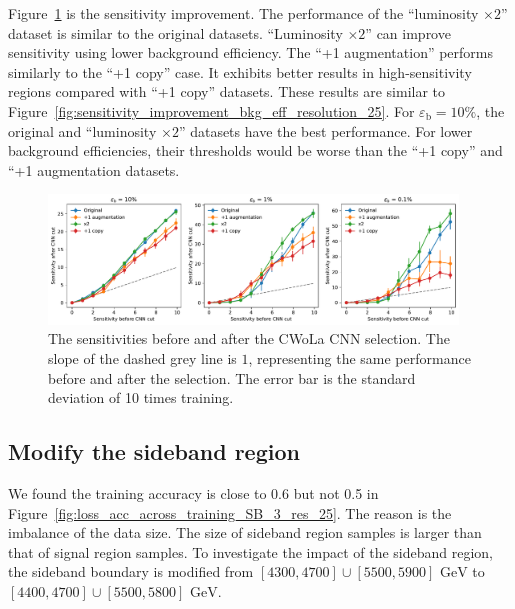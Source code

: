 \documentclass[12pt]{article}
\begin{document}
        Figure~\ref{fig:sensitivity_improvement_aug_1_x2_copy_1_res_25} is the sensitivity improvement. The performance of the ``luminosity $\times 2$'' dataset is similar to the original datasets. ``Luminosity $\times 2$'' can improve sensitivity using lower background efficiency. The ``+1 augmentation'' performs similarly to the ``+1 copy'' case. It exhibits better results in high-sensitivity regions compared with ``+1 copy'' datasets. These results are similar to Figure~\ref{fig:sensitivity_improvement_bkg_eff_resolution_25}. For $\varepsilon_{\text{b}} = 10 \%$, the original and ``luminosity $\times 2$'' datasets have the best performance. For lower background efficiencies, their thresholds would be worse than the ``+1 copy'' and ``+1 augmentation datasets.
        \begin{figure}[htpb]
            \centering
            \includegraphics[width=0.97\textwidth]{HVmodel_sensitivity_improvement_origin_aug_1_x2_copy_1_res_25.pdf}
            \caption{The sensitivities before and after the CWoLa CNN selection. The slope of the dashed grey line is $1$, representing the same performance before and after the selection. The error bar is the standard deviation of 10 times training.}
            \label{fig:sensitivity_improvement_aug_1_x2_copy_1_res_25}
        \end{figure}
    \subsection{Modify the sideband region}%
    \label{sub:modify_the_sideband_region}
        We found the training accuracy is close to 0.6 but not 0.5 in Figure~\ref{fig:loss_acc_across_training_SB_3_res_25}. The reason is the imbalance of the data size. The size of sideband region samples is larger than that of signal region samples. To investigate the impact of the sideband region, the sideband boundary is modified from $[4300,4700] \cup [5500,5900] \text{ GeV}$ to $[4400,4700] \cup [5500,5800] \text{ GeV}$.
\end{document}
